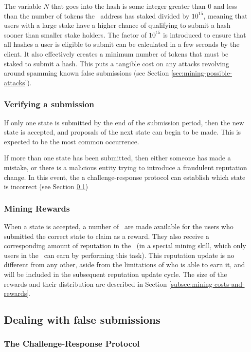 The variable $N$ that goes into the hash is some integer greater than 0 and less than the number of tokens the \rcth\ address has staked divided by $10^{15}$, meaning that users with a large stake have a higher chance of qualifying to submit a hash sooner than smaller stake holders. The factor of $10^{15}$ is introduced to ensure that all hashes a user is eligible to submit can be calculated in a few seconds by the client. It also effectively creates a minimum number of tokens that must be staked to submit a hash. This puts a tangible cost on any attacks revolving around spamming known false submissions (see Section \ref{sec:mining-possible-attacks}). 
%
\subsubsection*{Verifying a submission}
If only one state is submitted by the end of the submission period, then the new state is accepted, and proposals of the next state can begin to be made. This is expected to be the most common occurrence.

If more than one state has been submitted, then either someone has made a mistake, or there is a malicious entity trying to introduce a fraudulent reputation change. In this event, the a challenge-response protocol can establish which state is incorrect (see Section \ref{sec:challengeresponse})

\subsubsection*{Mining Rewards}

When a state is accepted, a number of \rcts\ are made available for the users who submitted the correct state to claim as a reward. They also receive a corresponding amount of reputation in the \rc\ (in a special mining skill, which only users in the \rc\ can earn by performing this task). This reputation update is no different from any other, aside from the limitations of who is able to earn it, and will be included in the subsequent reputation update cycle. The size of the rewards and their distribution are described in Section \ref{subsec:mining-costs-and-rewards}.

\subsection{Dealing with false submissions}\label{sec:challengeresponse}
%
\subsubsection{The Challenge-Response Protocol}

